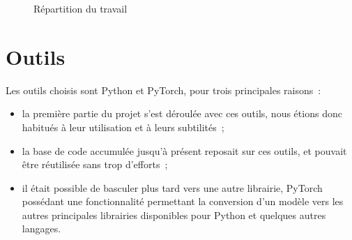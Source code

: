 \begin{figure}[ht]
	\centering
	\caption{Répartition du travail}\label{fig:papud_time}
\end{figure}

\section{Outils}
Les outils choisis sont Python et PyTorch, pour trois principales raisons~:
\begin{itemize}
	\item la première partie du projet s'est déroulée avec ces outils, nous étions donc habitués à leur utilisation et à leurs subtilités~;
	\item la base de code accumulée jusqu'à présent reposait sur ces outils, et pouvait être réutilisée sans trop d'efforts~;
	\item il était possible de basculer plus tard vers une autre librairie, PyTorch possédant une fonctionnalité permettant la conversion d'un modèle vers les autres principales librairies disponibles pour Python et quelques autres langages.
\end{itemize}


